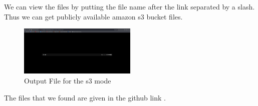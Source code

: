 \documentclass[12 pt]{article}
\begin{document}
\newline
We can view the files by putting the file name after the link separated by a slash. Thus we can get publicly available amazon s3 bucket files.
\begin{figure}[H]
    \centering
    \includegraphics[width=0.5\textwidth]{s3_Output_Success_File.png}
    \caption{Output File for the s3 mode}
    \label{fig: s3 Output Success File}
\end{figure}
\newline
The files that we found are given in the github link \cite{github_output}.
\end{document}
